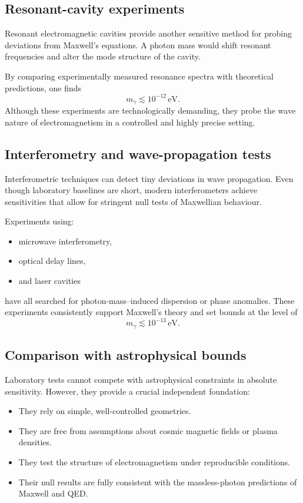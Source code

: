 \subsection*{Resonant-cavity experiments}

Resonant electromagnetic cavities provide another sensitive method for 
probing deviations from Maxwell’s equations. A photon mass would shift 
resonant frequencies and alter the mode structure of the cavity.

By comparing experimentally measured resonance spectra with theoretical 
predictions, one finds
\[
m_\gamma \lesssim 10^{-12}\,\text{eV}.
\]
Although these experiments are technologically demanding, they probe the 
wave nature of electromagnetism in a controlled and highly precise setting.

\subsection*{Interferometry and wave-propagation tests}

Interferometric techniques can detect tiny deviations in wave propagation. 
Even though laboratory baselines are short, modern interferometers achieve 
sensitivities that allow for stringent null tests of Maxwellian behaviour.

Experiments using:

\begin{itemize}
	\item microwave interferometry,
	\item optical delay lines,
	\item and laser cavities
\end{itemize}

have all searched for photon-mass–induced dispersion or phase anomalies.  
These experiments consistently support Maxwell’s theory and set bounds at 
the level of
\[
m_\gamma \lesssim 10^{-13}\,\text{eV}.
\]

\subsection*{Comparison with astrophysical bounds}

Laboratory tests cannot compete with astrophysical constraints in absolute 
sensitivity. However, they provide a crucial independent foundation:

\begin{itemize}
	\item They rely on simple, well-controlled geometries.
	\item They are free from assumptions about cosmic magnetic fields or 
	plasma densities.
	\item They test the structure of electromagnetism under reproducible 
	conditions.
	\item Their null results are fully consistent with the massless-photon 
	predictions of Maxwell and QED.
\end{itemize}

